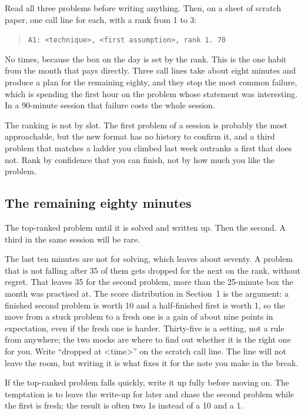 Read all three problems before writing anything. Then, on a sheet of scratch paper, one call line for each, with a rank from 1 to 3:

\begin{quote}
\texttt{A1: <technique>, <first assumption>, rank 1. 70}
\end{quote}

No times, because the box on the day is set by the rank. This is the one habit from the month that pays directly. Three call lines take about eight minutes and produce a plan for the remaining eighty, and they stop the most common failure, which is spending the first hour on the problem whose statement was interesting. In a 90-minute session that failure costs the whole session.

The ranking is not by slot. The first problem of a session is probably the most approachable, but the new format has no history to confirm it, and a third problem that matches a ladder you climbed last week outranks a first that does not. Rank by confidence that you can finish, not by how much you like the problem.

\subsection*{The remaining eighty minutes}

The top-ranked problem until it is solved and written up. Then the second. A third in the same session will be rare.

The last ten minutes are not for solving, which leaves about seventy. A problem that is not falling after 35 of them gets dropped for the next on the rank, without regret. That leaves 35 for the second problem, more than the 25-minute box the month was practised at. The score distribution in Section~1 is the argument: a finished second problem is worth 10 and a half-finished first is worth 1, so the move from a stuck problem to a fresh one is a gain of about nine points in expectation, even if the fresh one is harder. Thirty-five is a setting, not a rule from anywhere; the two mocks are where to find out whether it is the right one for you. Write ``dropped at <time>'' on the scratch call line. The line will not leave the room, but writing it is what fixes it for the note you make in the break.

If the top-ranked problem falls quickly, write it up fully before moving on. The temptation is to leave the write-up for later and chase the second problem while the first is fresh; the result is often two 1s instead of a 10 and a 1.

